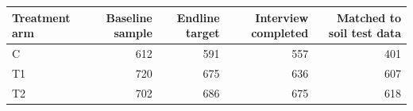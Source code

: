 \begin{tabular}{lrrrr}
\hline\hline
Treatment arm & Baseline sample & Endline target & Interview completed & Matched to soil test data \\
\hline
C & 612 & 591 & 557 & 401 \\
T1 & 720 & 675 & 636 & 607 \\
T2 & 702 & 686 & 675 & 618 \\
\hline\hline
\end{tabular}
